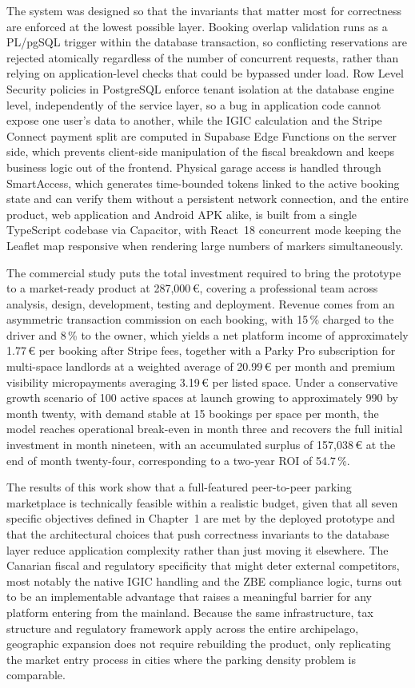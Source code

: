 The system was designed so that the invariants that matter most for correctness are enforced at the lowest possible layer. Booking overlap validation runs as a PL/pgSQL trigger within the database transaction, so conflicting reservations are rejected atomically regardless of the number of concurrent requests, rather than relying on application-level checks that could be bypassed under load. Row Level Security policies in PostgreSQL enforce tenant isolation at the database engine level, independently of the service layer, so a bug in application code cannot expose one user's data to another, while the IGIC calculation and the Stripe Connect payment split are computed in Supabase Edge Functions on the server side, which prevents client-side manipulation of the fiscal breakdown and keeps business logic out of the frontend. Physical garage access is handled through SmartAccess, which generates time-bounded tokens linked to the active booking state and can verify them without a persistent network connection, and the entire product, web application and Android APK alike, is built from a single TypeScript codebase via Capacitor, with React~18 concurrent mode keeping the Leaflet map responsive when rendering large numbers of markers simultaneously.

The commercial study puts the total investment required to bring the prototype to a market-ready product at 287,000\,€, covering a professional team across analysis, design, development, testing and deployment. Revenue comes from an asymmetric transaction commission on each booking, with 15\,\% charged to the driver and 8\,\% to the owner, which yields a net platform income of approximately 1.77\,€ per booking after Stripe fees, together with a Parky Pro subscription for multi-space landlords at a weighted average of 20.99\,€ per month and premium visibility micropayments averaging 3.19\,€ per listed space. Under a conservative growth scenario of 100 active spaces at launch growing to approximately 990 by month twenty, with demand stable at 15 bookings per space per month, the model reaches operational break-even in month three and recovers the full initial investment in month nineteen, with an accumulated surplus of 157,038\,€ at the end of month twenty-four, corresponding to a two-year ROI of 54.7\,\%.

The results of this work show that a full-featured peer-to-peer parking marketplace is technically feasible within a realistic budget, given that all seven specific objectives defined in Chapter~1 are met by the deployed prototype and that the architectural choices that push correctness invariants to the database layer reduce application complexity rather than just moving it elsewhere. The Canarian fiscal and regulatory specificity that might deter external competitors, most notably the native IGIC handling and the ZBE compliance logic, turns out to be an implementable advantage that raises a meaningful barrier for any platform entering from the mainland. Because the same infrastructure, tax structure and regulatory framework apply across the entire archipelago, geographic expansion does not require rebuilding the product, only replicating the market entry process in cities where the parking density problem is comparable.

